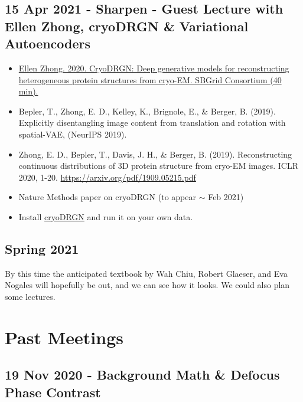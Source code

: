 \documentclass[11pt, oneside]{article}   	%
\begin{document}
\subsection{15 Apr 2021 - Sharpen - Guest Lecture with Ellen Zhong, cryoDRGN \& Variational Autoencoders}
\begin{itemize}
	\item \href{https://youtu.be/yft_qhErStg}{Ellen Zhong. 2020. CryoDRGN: Deep generative models for reconstructing heterogeneous protein structures from cryo-EM. SBGrid Consortium (40 min).}
	\item Bepler, T., Zhong, E. D., Kelley, K., Brignole, E., \& Berger, B. (2019). Explicitly disentangling image content from translation and rotation with spatial-VAE, (NeurIPS 2019).
	\item Zhong, E. D., Bepler, T., Davis, J. H., \& Berger, B. (2019). Reconstructing continuous distributions of 3D protein structure from cryo-EM images. ICLR 2020, 1-20. \url{https://arxiv.org/pdf/1909.05215.pdf}
	\item Nature Methods paper on cryoDRGN (to appear $\sim$ Feb 2021)
\end{itemize}
\begin{itemize}
	\item Install \href{https://github.com/zhonge/cryodrgn}{cryoDRGN} and run it on your own data.
\end{itemize}


\pagebreak
\subsection{Spring 2021}
By this time the anticipated textbook by Wah Chiu, Robert Glaeser, and Eva Nogales will hopefully be out, and we can see how it looks. We could also plan some lectures.

\pagebreak
\section{Past Meetings}


\subsection{19 Nov 2020 - Background Math \& Defocus Phase Contrast}
\end{document}
